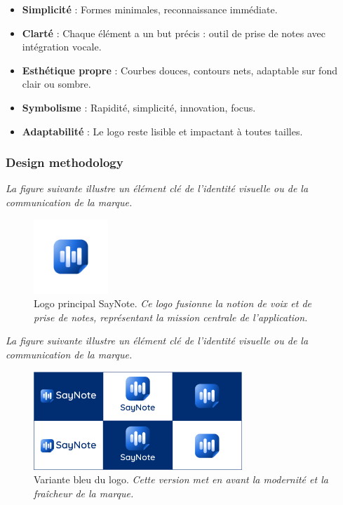 \begin{itemize}
    \item \textbf{Simplicité} : Formes minimales, reconnaissance immédiate.
    \item \textbf{Clarté} : Chaque élément a un but précis : outil de prise de notes avec intégration vocale.
    \item \textbf{Esthétique propre} : Courbes douces, contours nets, adaptable sur fond clair ou sombre.
    \item \textbf{Symbolisme} : Rapidité, simplicité, innovation, focus.
    \item \textbf{Adaptabilité} : Le logo reste lisible et impactant à toutes tailles.
\end{itemize}

\subsubsection{Design methodology}
\noindent
\textit{La figure suivante illustre un élément clé de l'identité visuelle ou de la communication de la marque.}
\begin{figure}[H]
    \centering
    \includegraphics[width=0.25\textwidth]{docs/visual-indentity/pictures/logo.png}
    \caption{Logo principal SayNote. \newline\textit{Ce logo fusionne la notion de voix et de prise de notes, représentant la mission centrale de l'application.}}
\end{figure}

\noindent
\textit{La figure suivante illustre un élément clé de l'identité visuelle ou de la communication de la marque.}
\begin{figure}[H]
    \centering
    \includegraphics[width=0.7\textwidth]{docs/visual-indentity/pictures/logo-varaition-blue.jpg}
    \caption{Variante bleu du logo. \newline\textit{Cette version met en avant la modernité et la fraîcheur de la marque.}}
\end{figure}

